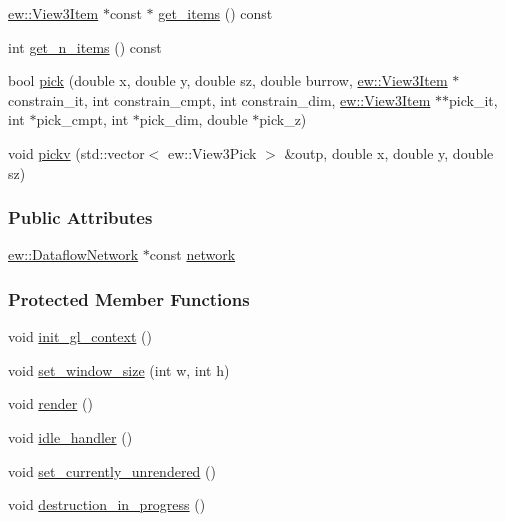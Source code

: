 \begin{DoxyCompactItemize}
\item 
\hyperlink{classew_1_1View3Item}{ew::View3Item} $\ast$const $\ast$ \hyperlink{classew_1_1View3Widget_a6c500ae68bc82dbe0e0ce7666378c91e}{get\_\-items} () const 
\item 
int \hyperlink{classew_1_1View3Widget_a9642dd4658ff57a033b30b61d8490ba5}{get\_\-n\_\-items} () const 
\item 
bool \hyperlink{classew_1_1View3Widget_aed2a64f83da416351fbcd37d66a56250}{pick} (double x, double y, double sz, double burrow, \hyperlink{classew_1_1View3Item}{ew::View3Item} $\ast$constrain\_\-it, int constrain\_\-cmpt, int constrain\_\-dim, \hyperlink{classew_1_1View3Item}{ew::View3Item} $\ast$$\ast$pick\_\-it, int $\ast$pick\_\-cmpt, int $\ast$pick\_\-dim, double $\ast$pick\_\-z)
\item 
void \hyperlink{classew_1_1View3Widget_a3d086998acf5fcfbb221c2cc1a774747}{pickv} (std::vector$<$ ew::View3Pick $>$ \&outp, double x, double y, double sz)
\end{DoxyCompactItemize}
\subsubsection*{Public Attributes}
\begin{DoxyCompactItemize}
\item 
\hyperlink{classew_1_1DataflowNetwork}{ew::DataflowNetwork} $\ast$const \hyperlink{classew_1_1View3Widget_ac8286c0fe23b39e10e53b161c03edb2a}{network}
\end{DoxyCompactItemize}
\subsubsection*{Protected Member Functions}
\begin{DoxyCompactItemize}
\item 
void \hyperlink{classew_1_1View3Widget_afcb1865c30ff2cef21fd67a889ef9674}{init\_\-gl\_\-context} ()
\item 
void \hyperlink{classew_1_1View3Widget_aee016ae0336d99acddda96df0c1c44ee}{set\_\-window\_\-size} (int w, int h)
\item 
void \hyperlink{classew_1_1View3Widget_a000e78ae04b0555b267f018522ecb6ef}{render} ()
\item 
void \hyperlink{classew_1_1View3Widget_aad31a4cc883fb08a6268865eca5ec7b0}{idle\_\-handler} ()
\item 
void \hyperlink{classew_1_1View3Widget_a17d0490efc5493c3754bae568de8c744}{set\_\-currently\_\-unrendered} ()
\item 
void \hyperlink{classew_1_1View3Widget_a2900ee4082e49bb62e7b6fba85d25ce4}{destruction\_\-in\_\-progress} ()
\end{DoxyCompactItemize}
